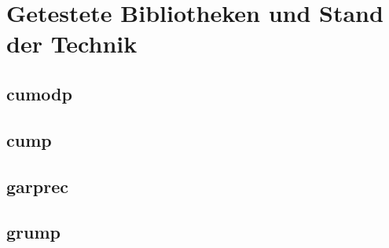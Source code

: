 \section{Getestete Bibliotheken und Stand der Technik}

\subsection{cumodp}
\subsection{cump}
\subsection{garprec}
\subsection{grump}